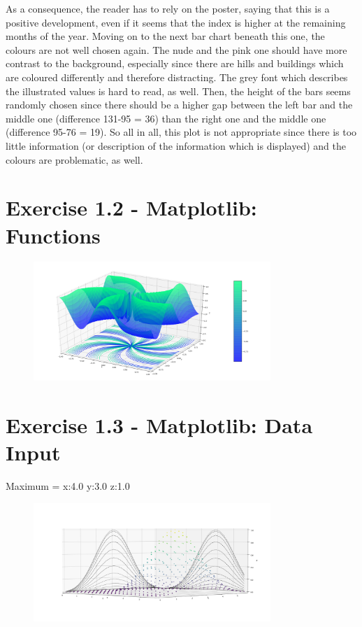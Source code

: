 \documentclass[a4paper]{article}
\begin{document}
	As a consequence, the reader has to rely on the poster, saying that this is a positive development, even if it seems that the index is higher at the remaining months of the year. 
	Moving on to the next bar chart beneath this one, the colours are not well chosen again. 
	The nude and the pink one should have more contrast to the background, especially since there are hills and buildings which are coloured differently and therefore distracting. 
	The grey font which describes the illustrated values is hard to read, as well. 
	Then, the height of the bars seems randomly chosen since there should be a higher gap between the left bar and the middle one (difference 131-95 = 36)  than the right one and the middle one (difference 95-76 = 19). 
	So all in all, this plot is not appropriate since there is too little information (or description of the information which is displayed) and the colours are problematic, as well.
	
	\newpage
	\section*{Exercise 1.2 - Matplotlib: Functions}
	\begin{figure}[!ht]
    \centering
	\includegraphics[width=0.8\textwidth]{1-2.png}
	\end{figure}
	
	\section*{Exercise 1.3 - Matplotlib: Data Input}
	Maximum = x:4.0 y:3.0 z:1.0
	\begin{figure}[!ht]
    \centering
	\includegraphics[width=0.8\textwidth]{1-3.png}
	\end{figure}
\end{document}
